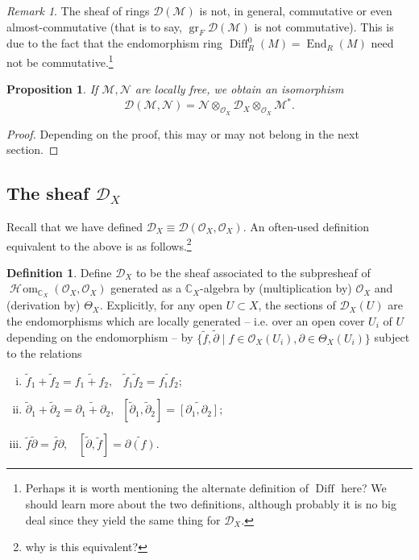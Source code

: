 \documentclass{article}
\newcommand{\C}{\mathbb{C}}
\theoremstyle{plain}
\newtheorem{proposition}[theorem]{Proposition}
\theoremstyle{definition}
\newtheorem{definition}[theorem]{Definition}
\theoremstyle{remark}
\newtheorem*{remark}{Remark}
\DeclareMathOperator{\End}{End}
\DeclareMathOperator{\sHom}{\mathscr{H}\!om}
\DeclareMathOperator{\Diff}{Diff}
\DeclareMathOperator{\gr}{gr}
\begin{document}
\begin{remark}
    The sheaf of rings $\mathcal{D}(\mathcal{M})$ is not, in general, commutative or even
    almost-commutative (that is to say, $\gr_F \mathcal{D}(\mathcal{M})$ is not commutative).
    This is due to the fact that the endomorphism ring $\Diff_R^0(M)=\End_R(M)$ need not be
    commutative.\footnote{Perhaps it is worth mentioning the alternate definition of $\Diff$ here? We
    should learn more about the two definitions, although probably it is no big deal since
    they yield the same thing for $\mathcal{D}_X$.}
\end{remark}

\begin{proposition}
    If $\mathcal{M},\mathcal{N}$ are locally free, we obtain an isomorphism
    \[\mathcal{D}(\mathcal{M},\mathcal{N})=\mathcal{N}\otimes_{\mathcal{O}_X}\mathcal{D}_X\otimes_{\mathcal{O}_X}\mathcal{M}^*.\]
\end{proposition}
\begin{proof}
    Depending on the proof, this may or may not belong in the next section.
\end{proof}

\subsection{The sheaf $\mathcal{D}_X$}

Recall that we have defined $\mathcal{D}_X\equiv\mathcal{D}(\mathcal{O}_X,\mathcal{O}_X)$.
An often-used definition equivalent to the above is as follows.\footnote{why is this equivalent?} 

\begin{definition}
    Define $\mathcal{D}_X$ to be the sheaf associated to the subpresheaf of $\sHom_{\C_X}(\mathcal{O}_X,\mathcal{O}_X)$
    generated as a $\C_X$-algebra by (multiplication by) $\mathcal{O}_X$ and (derivation by)
    $\Theta_X$. Explicitly, for any open $U\subset X$, the sections of $\mathcal{D}_X(U)$ are
    the endomorphisms which are locally generated -- i.e. over an open cover $U_i$ of $U$ depending
    on the endomorphism -- by 
    $\{\tilde f,\tilde \partial\mid f\in\mathcal{O}_X(U_i),\partial\in\Theta_X(U_i)\}$
    subject to the relations
    \begin{enumerate}[(i)]
        \item $\tilde f_1+\tilde f_2=\widetilde{f_1+f_2}, \;\;\; \tilde f_1\tilde f_2=\widetilde{f_1f_2};$
        \item $\tilde \partial_1 +\tilde \partial_2=\widetilde{\partial_1+\partial_2}, \;\; [\tilde\partial_1,\tilde\partial_2]=\widetilde{[\partial_1,\partial_2]};$
        \item $\tilde f\tilde \partial=\widetilde{f\partial}, \;\;\; [\tilde\partial,\tilde f]=\widetilde{\partial(f)}$.
    \end{enumerate}
    \label{def:D_X2}
\end{definition}
\end{document}
